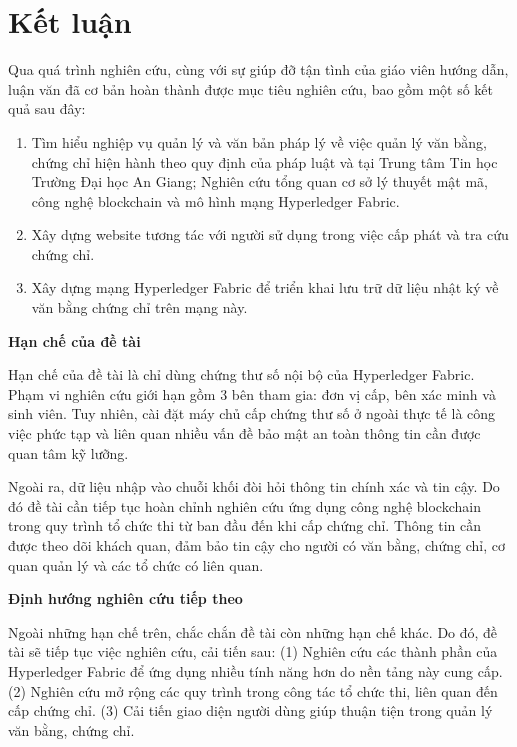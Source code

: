 \chapter{Kết luận}
Qua quá trình nghiên cứu, cùng với sự giúp đỡ tận tình của giáo viên hướng dẫn, luận văn đã cơ bản hoàn thành được mục tiêu nghiên cứu, bao gồm một số kết quả sau đây:

\begin{enumerate}

\item Tìm hiểu nghiệp vụ quản lý và văn bản pháp lý về việc quản lý văn bằng, chứng chỉ hiện hành theo quy định của pháp luật và tại Trung tâm Tin học Trường Đại học An Giang; Nghiên cứu tổng quan cơ sở lý thuyết mật mã, công nghệ blockchain và mô hình mạng Hyperledger Fabric.

\item Xây dựng website tương tác với người sử dụng trong việc cấp phát và tra cứu chứng chỉ.

\item Xây dựng mạng Hyperledger Fabric để triển khai lưu trữ dữ liệu nhật ký về văn bằng chứng chỉ trên mạng này.
\end{enumerate}

\textbf{Hạn chế của đề tài}

Hạn chế của đề tài là chỉ dùng chứng thư số nội bộ của Hyperledger Fabric. Phạm vi nghiên cứu giới hạn gồm 3 bên tham gia: đơn vị cấp, bên xác minh và sinh viên. Tuy nhiên, cài đặt máy chủ cấp chứng thư số ở ngoài thực tế là công việc phức tạp và liên quan nhiều vấn đề bảo mật an toàn thông tin cần được quan tâm kỹ lưỡng.

Ngoài ra, dữ liệu nhập vào chuỗi khối đòi hỏi thông tin chính xác và tin cậy. Do đó đề tài cần tiếp tục hoàn chỉnh nghiên cứu ứng dụng công nghệ blockchain trong quy trình tổ chức thi từ ban đầu đến khi cấp chứng chỉ. Thông tin cần được theo dõi khách quan, đảm bảo tin cậy cho người có văn bằng, chứng chỉ, cơ quan quản lý  và các tổ chức có liên quan.

\textbf{Định hướng nghiên cứu tiếp theo}

Ngoài những hạn chế trên, chắc chắn đề tài còn những hạn chế khác. Do đó, đề tài sẽ tiếp tục việc nghiên cứu, cải tiến sau: (1) Nghiên cứu các thành phần của Hyperledger Fabric để ứng dụng nhiều tính năng hơn do nền tảng này cung cấp.  (2) Nghiên cứu mở rộng các quy trình trong công tác tổ chức thi, liên quan đến cấp chứng chỉ. (3) Cải tiến giao diện người dùng giúp thuận tiện trong quản lý văn bằng, chứng chỉ.
